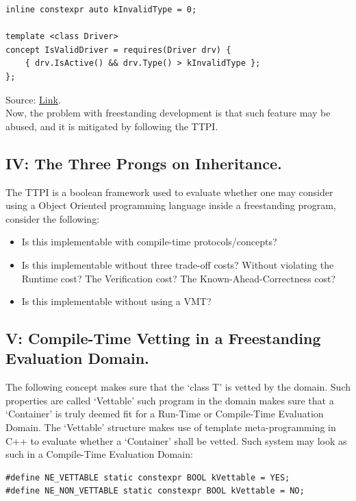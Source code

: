 \documentclass[11pt, a4paper]{article}
\begin{document}
{{\begin{lstlisting}
inline constexpr auto kInvalidType = 0;

template <class Driver>
concept IsValidDriver = requires(Driver drv) {
	{ drv.IsActive() && drv.Type() > kInvalidType };
};
\end{lstlisting} Source: \href{https://github.com/nekernel-org/nekernel/blob/develop/src/libDDK/DriverKit/c%2B%2B/driver_base.h}{Link}.\\ Now, the problem with freestanding development is that such feature may be abused, and it is mitigated by following the TTPI.

\subsection{IV: The Three Prongs on Inheritance.}

The TTPI is a boolean framework used to evaluate whether one may consider using a Object Oriented programming language inside a freestanding program, consider the following:

\begin{itemize}
\item[1:] Is this implementable with compile-time protocols/concepts?
\item[2:] Is this implementable without three trade-off costs?
	\subitem Without violating the Runtime cost?
	\subitem The Verification cost?
	\subitem The Known-Ahead-Correctness cost?
\item[3:] Is this implementable without using a VMT?
\end{itemize}
}

\subsection{V: Compile-Time Vetting in a Freestanding Evaluation Domain.}

The following concept makes sure that the `class T' is vetted by the domain. Such properties are called `Vettable' such program in the domain makes sure that a `Container' is truly deemed fit for a Run-Time or Compile-Time Evaluation Domain. The `Vettable' structure makes use of template meta-programming in C++ to evaluate whether a `Container' shall be vetted. Such system may look as such in a Compile-Time Evaluation Domain:

\begin{lstlisting}
#define NE_VETTABLE static constexpr BOOL kVettable = YES;
#define NE_NON_VETTABLE static constexpr BOOL kVettable = NO;


\end{lstlisting}}
\end{document}
